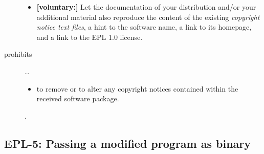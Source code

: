 \begin{description}
\begin{itemize}
  \item \textbf{[voluntary:]} Let the documentation of your distribution and/or
  your additional material also reproduce the content of the existing
  \emph{copyright notice text files}, a hint to the software name, a link to its
  homepage, and a link to the EPL 1.0 license.
  
 \end{itemize}
 
\item[prohibits] \ldots
\begin{itemize}
  \item to remove or to alter any copyright notices contained within the
  received software package.
\end{itemize}.

\end{description}

\subsection{EPL-5: Passing a modified program as binary}

